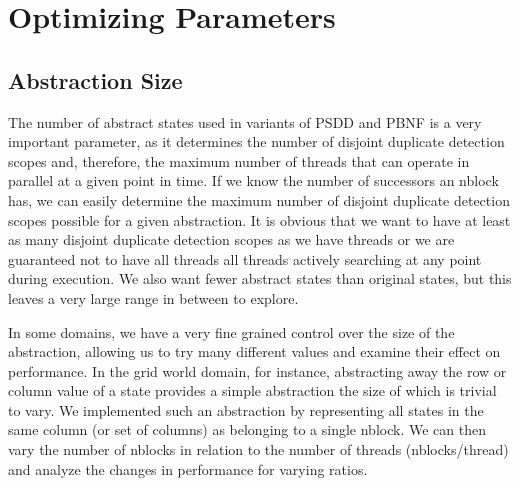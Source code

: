 \documentclass{article}
\begin{document}
\section{Optimizing Parameters}
\subsection{Abstraction Size}
The number of abstract states used in variants of PSDD and PBNF is a very important parameter, as it determines the number of disjoint duplicate detection scopes and, therefore, the maximum number of threads that can operate in parallel at a given point in time. If we know the number of successors an nblock has, we can easily determine the maximum number of disjoint duplicate detection scopes possible for a given abstraction. It is obvious that we want to have at least as many disjoint duplicate detection scopes as we have threads or we are guaranteed not to have all threads all threads actively searching at any point during execution. We also want fewer abstract states than original states, but this leaves a very large range in between to explore.

In some domains, we have a very fine grained control over the size of the abstraction, allowing us to try many different values and examine their effect on performance. In the grid world domain, for instance, abstracting away the row or column value of a state provides a simple abstraction the size of which is trivial to vary. We implemented such an abstraction by representing all states in the same column (or set of columns) as belonging to a single nblock. We can then vary the number of nblocks in relation to the number of threads (nblocks/thread) and analyze the changes in performance for varying ratios.


\end{document}
